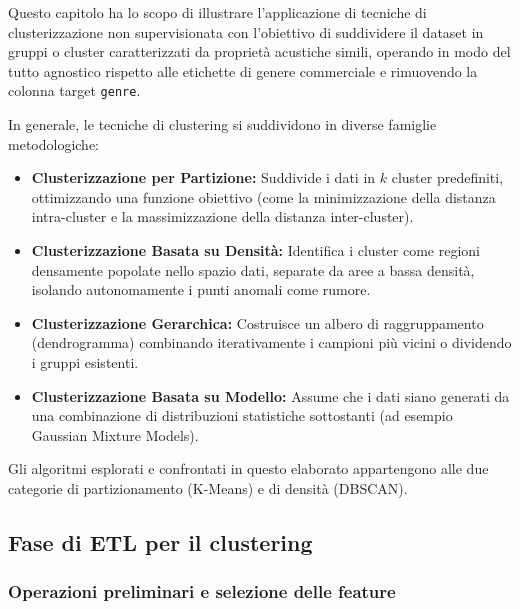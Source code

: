 \documentclass[12pt,a4paper]{article}
\begin{document}
Questo capitolo ha lo scopo di illustrare l'applicazione di tecniche di clusterizzazione non supervisionata con l'obiettivo di suddividere il dataset in gruppi o cluster caratterizzati da proprietà acustiche simili, operando in modo del tutto agnostico rispetto alle etichette di genere commerciale e rimuovendo la colonna target \texttt{genre}.

In generale, le tecniche di clustering si suddividono in diverse famiglie metodologiche:
\begin{itemize}
    \item \textbf{Clusterizzazione per Partizione:} Suddivide i dati in $k$ cluster predefiniti, ottimizzando una funzione obiettivo (come la minimizzazione della distanza intra-cluster e la massimizzazione della distanza inter-cluster).
    \item \textbf{Clusterizzazione Basata su Densità:} Identifica i cluster come regioni densamente popolate nello spazio dati, separate da aree a bassa densità, isolando autonomamente i punti anomali come rumore.
    \item \textbf{Clusterizzazione Gerarchica:} Costruisce un albero di raggruppamento (dendrogramma) combinando iterativamente i campioni più vicini o dividendo i gruppi esistenti.
    \item \textbf{Clusterizzazione Basata su Modello:} Assume che i dati siano generati da una combinazione di distribuzioni statistiche sottostanti (ad esempio Gaussian Mixture Models).
\end{itemize}

Gli algoritmi esplorati e confrontati in questo elaborato appartengono alle due categorie di partizionamento (K-Means) e di densità (DBSCAN).

\subsection{Fase di ETL per il clustering}

\subsubsection{Operazioni preliminari e selezione delle feature}
\end{document}
